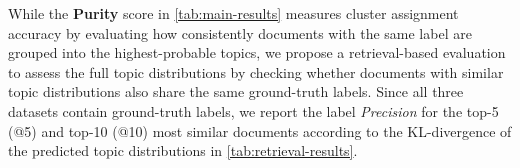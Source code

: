 \documentclass{article}
\theoremstyle{plain}
\theoremstyle{definition}
\theoremstyle{remark}
\begin{document}






While the \textbf{Purity} score in \autoref{tab:main-results} measures
cluster assignment accuracy by evaluating how consistently documents
with the same label are grouped into the highest-probable topics, we
propose a retrieval-based evaluation to assess the full topic
distributions by checking whether documents with similar topic
distributions also share the same ground-truth labels. Since all
three datasets contain ground-truth labels, we report the label
\textit{Precision} for the top-5 (@5) and top-10 (@10) most similar
documents according to the KL-divergence of the predicted topic
distributions in \autoref{tab:retrieval-results}.
\end{document}
